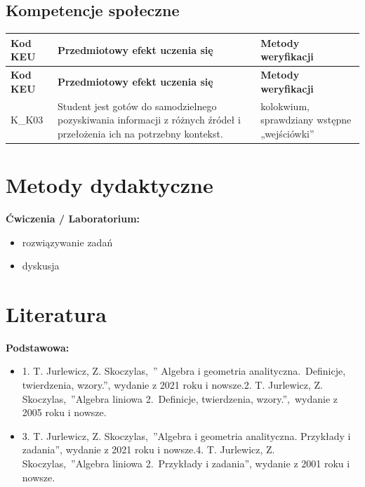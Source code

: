 \documentclass[12pt, a4paper]{article}
\newcommand{\thdrule}{\noalign{\global\setlength{\extrarowheight}{0pt}}}
\newcommand{\thdend}{\noalign{\global\setlength{\extrarowheight}{3pt}}}
\begin{document}
\subsection*{Kompetencje społeczne}
{\scriptsize
\begin{longtable}{m{1.6cm}m{9.0cm}m{4.2cm}}
\thdrule\toprule
\rowcolor{pjatkRed} {\color{white}\footnotesize\textbf{\vphantom{Ag}Kod KEU}} & {\color{white}\footnotesize\textbf{\vphantom{Ag}Przedmiotowy efekt uczenia się}} & {\color{white}\footnotesize\textbf{\vphantom{Ag}Metody weryfikacji}} \\
\midrule\thdend
\endfirsthead
\thdrule\toprule
\rowcolor{pjatkRed} {\color{white}\footnotesize\textbf{\vphantom{Ag}Kod KEU}} & {\color{white}\footnotesize\textbf{\vphantom{Ag}Przedmiotowy efekt uczenia się}} & {\color{white}\footnotesize\textbf{\vphantom{Ag}Metody weryfikacji}} \\
\midrule\thdend
\endhead
  \rowcolor{tableRowLight} K\_K03 & Student jest gotów do samodzielnego pozyskiwania informacji z różnych źródeł i przełożenia ich na potrzebny kontekst. & kolokwium, sprawdziany wstępne „wejściówki'' \\
\bottomrule
\end{longtable}}

\section{Metody dydaktyczne}

\textbf{Ćwiczenia / Laboratorium:}
\begin{itemize}
  \item rozwiązywanie zadań
  \item dyskusja
\end{itemize}
\vspace{4pt}


\section{Literatura}

\textbf{Podstawowa:}
\begin{itemize}
  \item 1. T. Jurlewicz, Z. Skoczylas, '' Algebra i geometria analityczna. Definicje, twierdzenia, wzory.'', wydanie z 2021 roku i nowsze.2. T. Jurlewicz, Z. Skoczylas, ''Algebra liniowa 2. Definicje, twierdzenia, wzory.'', wydanie z 2005 roku i nowsze.
  \item 3. T. Jurlewicz, Z. Skoczylas, ''Algebra i geometria analityczna. Przykłady i zadania'', wydanie z 2021 roku i nowsze.4. T. Jurlewicz, Z. Skoczylas, ''Algebra liniowa 2. Przykłady i zadania'', wydanie z 2001 roku i nowsze.
\end{itemize}
\end{document}
